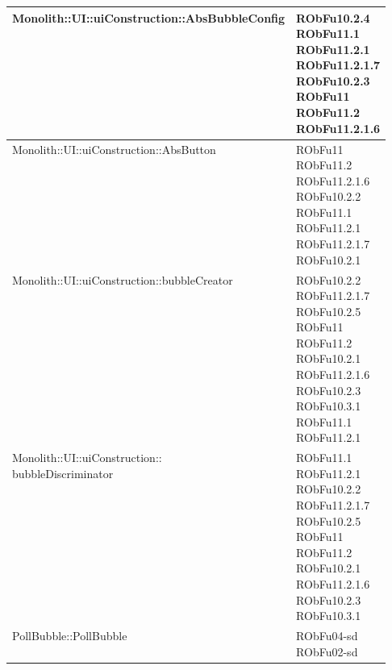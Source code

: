 \begin{center}
\begin{longtable}{|
*{1}{>{\centering\arraybackslash}m{7.5cm}|}
*{1}{>{\centering\arraybackslash}m{2.5cm}|}}
Monolith::UI::uiConstruction::AbsBubbleConfig & \makecell{RObFu10.2.4
\\RObFu11.1
\\RObFu11.2.1
\\RObFu11.2.1.7
\\RObFu10.2.3
\\RObFu11
\\RObFu11.2
\\RObFu11.2.1.6
\\}\\\hline
Monolith::UI::uiConstruction::AbsButton & \makecell{RObFu11
\\RObFu11.2
\\RObFu11.2.1.6
\\RObFu10.2.2
\\RObFu11.1
\\RObFu11.2.1
\\RObFu11.2.1.7
\\RObFu10.2.1
\\}\\\hline
Monolith::UI::uiConstruction::bubbleCreator & \makecell{RObFu10.2.2
\\RObFu11.2.1.7
\\RObFu10.2.5
\\RObFu11
\\RObFu11.2
\\RObFu10.2.1
\\RObFu11.2.1.6
\\RObFu10.2.3
\\RObFu10.3.1
\\RObFu11.1
\\RObFu11.2.1
\\}\\\hline
\makecell[l]{Monolith::UI::uiConstruction:: \\ \hfill bubbleDiscriminator} & \makecell{RObFu11.1
\\RObFu11.2.1
\\RObFu10.2.2
\\RObFu11.2.1.7
\\RObFu10.2.5
\\RObFu11
\\RObFu11.2
\\RObFu10.2.1
\\RObFu11.2.1.6
\\RObFu10.2.3
\\RObFu10.3.1
\\}\\\hline
PollBubble::PollBubble & \makecell{RObFu04-sd
\\RObFu02-sd
}
\end{longtable}
\end{center}

